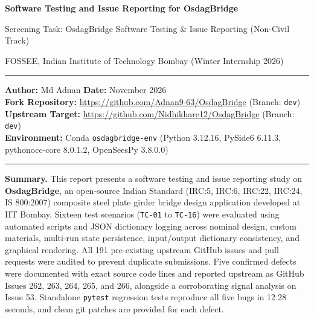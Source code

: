 \documentclass[11pt,a4paper]{article}
\begin{document}
\begin{center}
    {\Large \bfseries Software Testing and Issue Reporting for OsdagBridge \par}
    \vspace{3pt}
    {\normalsize Screening Task: OsdagBridge Software Testing \& Issue Reporting (Non-Civil Track) \par}
    {\small FOSSEE, Indian Institute of Technology Bombay (Winter Internship 2026) \par}
    \vspace{6pt}
    \rule{\textwidth}{0.6pt}
    \vspace{3pt}
    \begin{minipage}{0.98\textwidth}
        \small
        \textbf{Author:} Md Adnan \hfill \textbf{Date:} November 2026 \\
        \textbf{Fork Repository:} \url{https://github.com/Adnan9-63/OsdagBridge} (Branch: \texttt{dev}) \\
        \textbf{Upstream Target:} \url{https://github.com/Nidhikhare12/OsdagBridge} (Branch: \texttt{dev}) \\
        \textbf{Environment:} Conda \texttt{osdagbridge-env} (Python 3.12.16, PySide6 6.11.3, pythonocc-core 8.0.1.2, OpenSeesPy 3.8.0.0)
    \end{minipage}
    \vspace{3pt}
    \rule{\textwidth}{0.6pt}
\end{center}

\vspace{2pt}
\noindent\textbf{Summary.} This report presents a software testing and issue reporting study on \textbf{OsdagBridge}, an open-source Indian Standard (IRC:5, IRC:6, IRC:22, IRC:24, IS 800:2007) composite steel plate girder bridge design application developed at IIT Bombay. Sixteen test scenarios (\texttt{TC-01} to \texttt{TC-16}) were evaluated using automated scripts and JSON dictionary logging across nominal design, custom materials, multi-run state persistence, input/output dictionary consistency, and graphical rendering. All 191 pre-existing upstream GitHub issues and pull requests were audited to prevent duplicate submissions. Five confirmed defects were documented with exact source code lines and reported upstream as GitHub Issues 262, 263, 264, 265, and 266, alongside a corroborating signal analysis on Issue 53. Standalone \texttt{pytest} regression tests reproduce all five bugs in 12.28 seconds, and clean git patches are provided for each defect.
\vspace{6pt}
\end{document}
